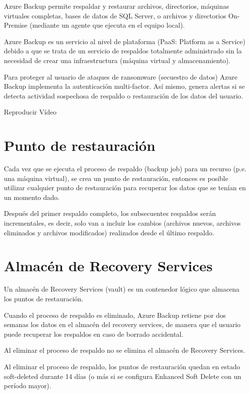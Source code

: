 Azure Backup permite respaldar y restaurar archivos, directorios, máquinas virtuales completas, bases de datos de SQL Server, o archivos y directorios On-Premise (mediante un agente que ejecuta en el equipo local).

Azure Backup es un servicio al nivel de plataforma (PaaS: Platform as a Service) debido a que se trata de un servicio de respaldos totalmente administrado sin la necesidad de crear una infraestructura (máquina virtual y almacenamiento).

Para proteger al usuario de ataques de ransomware (secuestro de datos) Azure Backup implementa la autenticación multi-factor. Así mismo, genera alertas si se detecta actividad sospechosa de respaldo o restauración de los datos del usuario.

Reproducir Vídeo

\section{Punto de restauración}

Cada vez que se ejecuta el proceso de respaldo (backup job) para un recurso (p.e. una máquina virtual), se crea un punto de restauración, entonces es posible utilizar cualquier punto de restauración para recuperar los datos que se tenían en un momento dado.

Después del primer respaldo completo, los subsecuentes respaldos serán incrementales, es decir, solo van a incluir los cambios (archivos nuevos, archivos eliminados y archivos modificados) realizados desde el último respaldo.

\section{Almacén de Recovery Services}

Un almacén de Recovery Services (vault) es un contenedor lógico que almacena los puntos de restauración.

Cuando el proceso de respaldo es eliminado, Azure Backup retiene por dos semanas los datos en el almacén del recovery services, de manera que el usuario puede recuperar los respaldos en caso de borrado accidental.

Al eliminar el proceso de respaldo no se elimina el almacén de Recovery Services.

Al eliminar el proceso de respaldo, los puntos de restauración quedan en estado soft-deleted durante 14 días (o más si se configura Enhanced Soft Delete con un período mayor).

